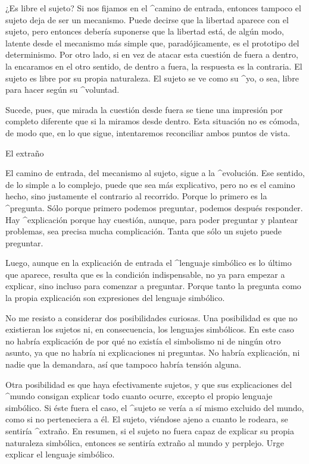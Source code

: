 ¿Es libre el sujeto? Si nos fijamos en el ^{camino de entrada}, entonces
tampoco el sujeto deja de ser un mecanismo. Puede decirse que la
libertad aparece con el sujeto, pero entonces debería suponerse que la
libertad está, de algún modo, latente desde el mecanismo más simple que,
paradójicamente, es el prototipo del determinismo. Por otro lado, si en
vez de atacar esta cuestión de fuera a dentro, la encaramos en el otro
sentido, de dentro a fuera, la respuesta es la contraria. El sujeto es
libre por su propia naturaleza. El sujeto se ve como su ^{yo}, o sea,
libre para hacer según su ^{voluntad}.

Sucede, pues, que mirada la cuestión desde fuera se tiene una impresión
por completo diferente que si la miramos desde dentro. Esta situación no
es cómoda, de modo que, en lo que sigue, intentaremos reconciliar ambos
puntos de vista.


\Section El extraño

El camino de entrada, del mecanismo al sujeto, sigue a la ^{evolución}.
Ese sentido, de lo simple a lo complejo, puede que sea más explicativo,
pero no es el camino hecho, sino justamente el contrario al recorrido.
Porque lo primero es la ^{pregunta}. Sólo porque primero podemos
preguntar, podemos después responder. Hay ^{explicación} porque hay
cuestión, aunque, para poder preguntar y plantear problemas, sea precisa
mucha complicación. Tanta que sólo un sujeto puede preguntar.

Luego, aunque en la explicación de entrada el ^{lenguaje simbólico} es
lo último que aparece, resulta que es la condición indispensable, no ya
para empezar a explicar, sino incluso para comenzar a preguntar. Porque
tanto la pregunta como la propia explicación son expresiones del
lenguaje simbólico.

No me resisto a considerar dos posibilidades curiosas. Una posibilidad
es que no existieran los sujetos ni, en consecuencia, los lenguajes
simbólicos. En este caso no habría explicación de por qué no existía el
simbolismo ni de ningún otro asunto, ya que no habría ni explicaciones
ni preguntas. No habría explicación, ni nadie que la demandara, así que
tampoco habría tensión alguna.

Otra posibilidad es que haya efectivamente sujetos, y que sus
explicaciones del ^{mundo} consigan explicar todo cuanto ocurre, excepto
el propio lenguaje simbólico. Si éste fuera el caso, el ^{sujeto} se
vería a sí mismo excluido del mundo, como si no perteneciera a él. El
sujeto, viéndose ajeno a cuanto le rodeara, se sentiría ^{extraño}. En
resumen, si el sujeto no fuera capaz de explicar su propia naturaleza
simbólica, entonces se sentiría extraño al mundo y perplejo. Urge
explicar el lenguaje simbólico.


